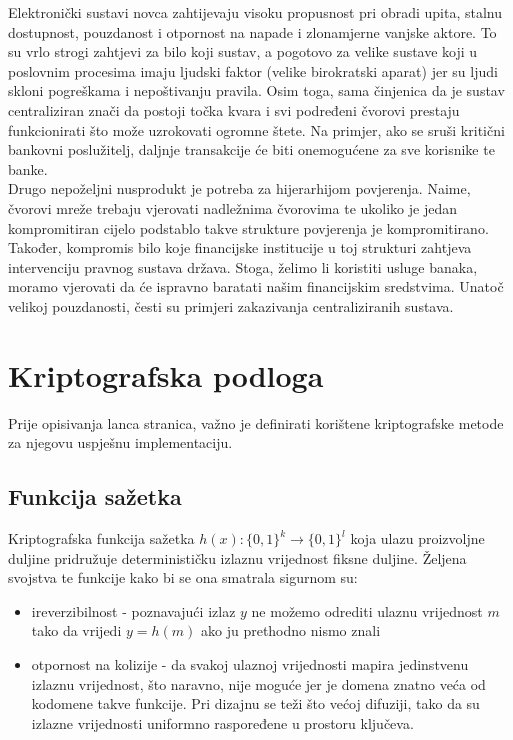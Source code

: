 \documentclass[utf8, zavrsni]{fer}
\begin{document}
	Elektronički sustavi novca zahtijevaju visoku propusnost pri obradi upita, stalnu dostupnost, pouzdanost i otpornost na napade i zlonamjerne vanjske aktore. To su vrlo strogi zahtjevi za bilo koji sustav, a pogotovo za velike sustave koji u poslovnim procesima imaju ljudski faktor (velike birokratski aparat) jer su ljudi skloni pogreškama i nepoštivanju pravila. Osim toga, sama činjenica da je sustav centraliziran znači da postoji točka kvara i svi podređeni čvorovi prestaju funkcionirati što može uzrokovati ogromne štete. Na primjer, ako se sruši kritični bankovni poslužitelj, daljnje transakcije će biti onemogućene za sve korisnike te banke. \\

	Drugo nepoželjni nusprodukt je potreba za hijerarhijom povjerenja. Naime, čvorovi mreže trebaju vjerovati nadležnima čvorovima te ukoliko je jedan kompromitiran cijelo podstablo takve strukture povjerenja je kompromitirano. Također, kompromis bilo koje financijske institucije u toj strukturi zahtjeva intervenciju pravnog sustava država.
Stoga, želimo li koristiti usluge banaka, moramo vjerovati da će ispravno baratati našim financijskim sredstvima.
Unatoč velikoj pouzdanosti, česti su primjeri zakazivanja centraliziranih sustava.

\chapter{Kriptografska podloga}
Prije opisivanja lanca stranica, važno je definirati korištene kriptografske metode za njegovu uspješnu implementaciju.
\section{Funkcija sažetka}
Kriptografska funkcija sažetka $h(x): \{0,1\}^k \rightarrow \{0,1\}^l$ koja ulazu proizvoljne duljine pridružuje determinističku izlaznu vrijednost fiksne duljine. Željena svojstva te funkcije kako bi se ona smatrala sigurnom su:

\begin{itemize}
	\item ireverzibilnost - poznavajući izlaz $y$ ne možemo odrediti ulaznu vrijednost $m$ tako da vrijedi $y = h(m)$ ako ju prethodno nismo znali
	\item otpornost na kolizije - da svakoj ulaznoj vrijednosti mapira jedinstvenu izlaznu vrijednost, što naravno, nije moguće jer je domena znatno veća od kodomene takve funkcije. Pri dizajnu se teži što većoj difuziji, tako da su izlazne vrijednosti uniformno raspoređene u prostoru ključeva.
\end{itemize}
\end{document}

